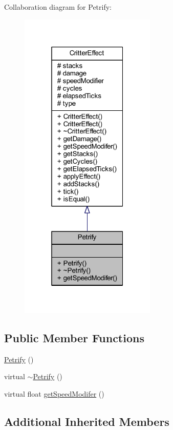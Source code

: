 Collaboration diagram for Petrify\+:
\nopagebreak
\begin{figure}[H]
\begin{center}
\leavevmode
\includegraphics[width=184pt]{struct_petrify__coll__graph}
\end{center}
\end{figure}
\subsection*{Public Member Functions}
\begin{DoxyCompactItemize}
\item 
\hyperlink{struct_petrify_a992aeb210a1e24c89600ed56a5f5b767}{Petrify} ()
\item 
virtual \hyperlink{struct_petrify_a091e1ab7cf7331d51ad5e3a466aa5e56}{$\sim$\+Petrify} ()
\item 
virtual float \hyperlink{struct_petrify_a5dbc65a84dfd4f6f809e39af9c33adfd}{get\+Speed\+Modifer} ()
\end{DoxyCompactItemize}
\subsection*{Additional Inherited Members}



